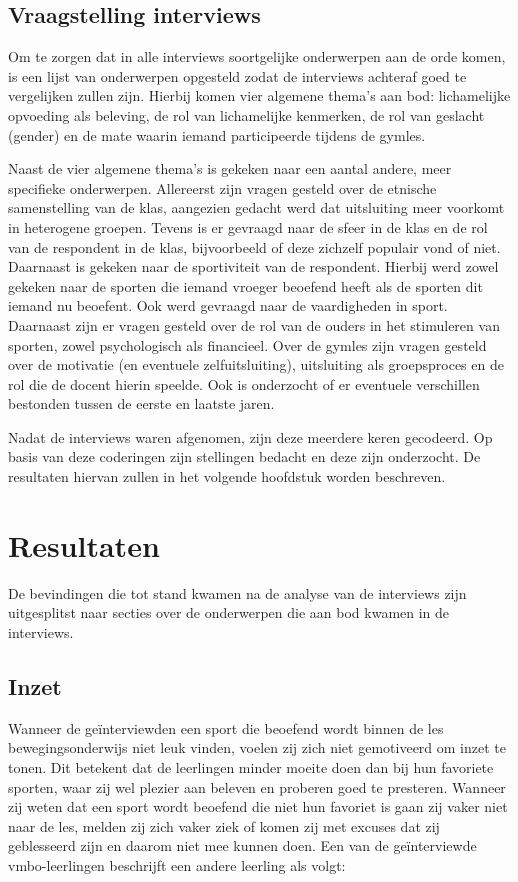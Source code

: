 \documentclass[a4paper,12pt]{memoir}
\begin{document}
\section{Vraagstelling interviews}

Om te zorgen dat in alle interviews soortgelijke onderwerpen aan de orde komen, is een lijst van onderwerpen opgesteld zodat de interviews achteraf goed te vergelijken zullen zijn. Hierbij komen vier algemene thema's aan bod: lichamelijke opvoeding als beleving, de rol van lichamelijke kenmerken, de rol van geslacht (gender) en de mate waarin iemand participeerde tijdens de gymles.

Naast de vier algemene thema's is gekeken naar een aantal andere, meer specifieke onderwerpen. Allereerst zijn vragen gesteld over de etnische samenstelling van de klas, aangezien gedacht werd dat uitsluiting meer voorkomt in heterogene groepen. Tevens is er gevraagd naar de sfeer in de klas en de rol van de respondent in de klas, bijvoorbeeld of deze zichzelf populair vond of niet. Daarnaast is gekeken naar de sportiviteit van de respondent. Hierbij werd zowel gekeken naar de sporten die iemand vroeger beoefend heeft als de sporten dit iemand nu beoefent. Ook werd gevraagd naar de vaardigheden in sport. Daarnaast zijn er vragen gesteld over de rol van de ouders in het stimuleren van sporten, zowel psychologisch als financieel. Over de gymles zijn vragen gesteld over de motivatie (en eventuele zelfuitsluiting), uitsluiting als groepsproces en de rol die de docent hierin speelde. Ook is onderzocht of er eventuele verschillen bestonden tussen de eerste en laatste jaren.

Nadat de interviews waren afgenomen, zijn deze meerdere keren gecodeerd. Op basis van deze coderingen zijn stellingen bedacht en deze zijn onderzocht. De resultaten hiervan zullen in het volgende hoofdstuk worden beschreven.

\chapter{Resultaten}

De bevindingen die tot stand kwamen na de analyse van de interviews zijn uitgesplitst naar secties over de onderwerpen die aan bod kwamen in de interviews.

\section{Inzet}

Wanneer de geïnterviewden een sport die beoefend wordt binnen de les bewegingsonderwijs niet leuk vinden, voelen zij zich niet gemotiveerd om inzet te tonen. Dit betekent dat de leerlingen minder moeite doen dan bij hun favoriete sporten, waar zij wel plezier aan beleven en proberen goed te presteren. Wanneer zij weten dat een sport wordt beoefend die niet hun favoriet is gaan zij vaker niet naar de les, melden zij zich vaker ziek of komen zij met excuses dat zij geblesseerd zijn en daarom niet mee kunnen doen. Een van de geïnterviewde vmbo-leerlingen beschrijft een andere leerling als volgt:
\end{document}
